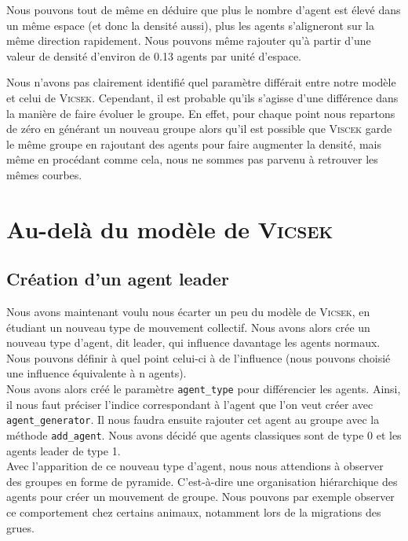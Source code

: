 \documentclass[french, a4paper, 12pt, openany]{report}
\begin{document}
	Nous pouvons tout de même en déduire que plus le nombre d'agent est élevé dans un même espace (et donc la densité aussi), plus les agents s'aligneront sur la même direction rapidement. Nous pouvons même rajouter qu'à partir d'une valeur de densité d'environ de 0.13 agents par unité d'espace. 
	
	Nous n'avons pas clairement identifié quel paramètre différait entre notre modèle et celui de \textsc{Vicsek}. Cependant, il est probable qu'ils s'agisse d'une différence dans la manière de faire évoluer le groupe. En effet, pour chaque point nous repartons de zéro en générant un nouveau groupe alors qu'il est possible que \textsc{Viscek} garde le même groupe en rajoutant des agents pour faire augmenter la densité, mais même en procédant comme cela, nous ne sommes pas parvenu à retrouver les mêmes courbes.
    \newpage
    \section{Au-delà du modèle de \textsc{Vicsek}}
    \subsection{Création d'un agent leader}
       Nous avons maintenant voulu nous écarter un peu du modèle de \textsc{Vicsek}, en étudiant un nouveau type de mouvement collectif. Nous avons alors crée un nouveau type d'agent, dit leader, qui influence davantage les agents normaux. Nous pouvons définir à quel point celui-ci à de l'influence (nous pouvons choisié une influence équivalente à n agents).\\
       
       Nous avons alors créé le paramètre \verb|agent_type| pour différencier les agents. Ainsi, il nous faut préciser l'indice correspondant à l'agent que l'on veut créer avec \verb|agent_generator|. Il nous faudra ensuite rajouter cet agent au groupe avec la méthode \verb|add_agent|. Nous avons décidé que agents classiques sont de type 0 et les agents leader de type 1.\\
       
       Avec l'apparition de ce nouveau type d'agent, nous nous attendions à observer des groupes en forme de pyramide. C'est-à-dire une organisation hiérarchique des agents pour créer un mouvement de groupe. Nous pouvons par exemple observer ce comportement chez certains animaux, notamment lors de la migrations des grues. 
       
\end{document}
